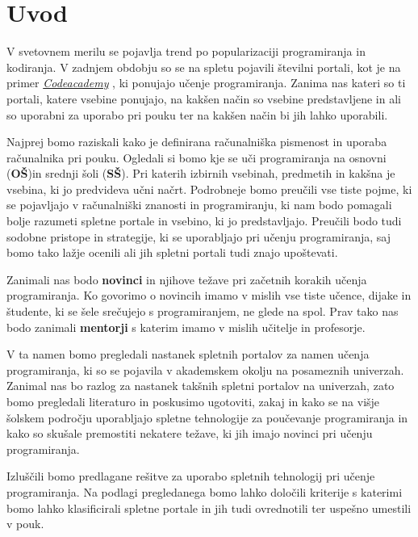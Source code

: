 \section{Uvod}
\label{sec:Uvod}


V svetovnem merilu se pojavlja trend po popularizaciji programiranja
in kodiranja. V zadnjem obdobju so se na spletu pojavili številni
portali, kot je na primer
\emph{\href{https://www.codecademy.com/}{Codeacademy}}
\cite{web:codeacademy}, ki ponujajo učenje programiranja. Zanima nas
kateri so ti portali, katere vsebine ponujajo, na kakšen način so
vsebine predstavljene in ali so uporabni za uporabo pri pouku ter na
kakšen način bi jih lahko uporabili.

Najprej bomo raziskali kako je definirana računalniška pismenost in
uporaba računalnika pri pouku. Ogledali si bomo kje se uči
programiranja na osnovni (\textbf{OŠ})in srednji šoli
(\textbf{SŠ}). Pri katerih izbirnih vsebinah, predmetih in kakšna je
vsebina, ki jo predvideva učni načrt. Podrobneje bomo preučili vse
tiste pojme, ki se pojavljajo v računalniški znanosti in
programiranju, ki nam bodo pomagali bolje razumeti spletne portale in
vsebino, ki jo predstavljajo.  Preučili bodo tudi sodobne pristope in
strategije, ki se uporabljajo pri učenju programiranja, saj bomo tako
lažje ocenili ali jih spletni portali tudi znajo upoštevati.

Zanimali nas bodo \textbf{novinci} in njihove težave pri začetnih
korakih učenja programiranja. Ko govorimo o novincih imamo v mislih
vse tiste učence, dijake in študente, ki se šele srečujejo s
programiranjem, ne glede na spol. Prav tako nas bodo zanimali
\textbf{mentorji} s katerim imamo v mislih učitelje in profesorje.

V ta namen bomo pregledali nastanek spletnih portalov za namen učenja
programiranja, ki so se pojavila v akademskem okolju na posameznih
univerzah. Zanimal nas bo razlog za nastanek takšnih spletni portalov
na univerzah, zato bomo pregledali literaturo in poskusimo ugotoviti,
zakaj in kako se na višje šolskem področju uporabljajo spletne
tehnologije za poučevanje programiranja in kako so skušale premostiti
nekatere težave, ki jih imajo novinci pri učenju programiranja.

Izluščili bomo predlagane rešitve za uporabo spletnih tehnologij pri
učenje programiranja. Na podlagi pregledanega bomo lahko določili
kriterije s katerimi bomo lahko klasificirali spletne portale in jih
tudi ovrednotili ter uspešno umestili v pouk.



